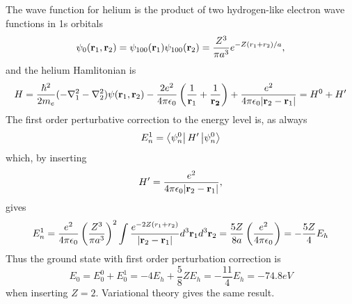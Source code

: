 \documentclass[11pt]{amsart}
\begin{document}
The wave function for helium is the product of two hydrogen-like electron wave functions in 1s orbitals
\begin{equation}
\label{eq:heliumwave}
\psi_0(\vb{r}_1,\vb{r}_2) = \psi_{100}(\vb{r}_1)\psi_{100}(\vb{r}_2)=\frac{Z^3}{\pi a^3}e^{-Z(r_1+r_2)/a},
\end{equation}
and the helium Hamlitonian is
\begin{equation}
H = \frac{\hbar^2}{2m_e}(-\nabla^2_1-\nabla^2_2)\psi(\vb{r}_1,\vb{r}_2) - \frac{2e^2}{4\pi\epsilon_0}\left(\frac{1}{\vb{r}_1}+\frac{1}{\vb{r_2}} \right) + \frac{e^2}{4\pi\epsilon_0\abs{\vb{r}_2-\vb{r}_1}} = H^0 + H'
\end{equation}
The first order perturbative correction to the energy level is, as always
\begin{equation}
\label{eq:heliumgroundEpeturb}
E_n^1 = \bra{\psi_n^0}H'\ket{\psi_n^0}
\end{equation}
which, by inserting
\begin{equation*}
H' = \frac{e^2}{4\pi\epsilon_0\abs{\vb{r}_2-\vb{r}_1}},
\end{equation*}
gives
\begin{equation}
E_n^1 = \frac{e^2}{4\pi\epsilon_0}\left(\frac{Z^3}{\pi a^3} \right)^2\int\frac{e^{-2Z(r_1+r_2)}}{\abs{\vb{r}_2-\vb{r}_1}}d^3\vb{r}_1d^3\vb{r}_2 = \frac{5Z}{8a}\left(\frac{e^2}{4\pi\epsilon_0} \right) = -\frac{5Z}{4}E_h
\end{equation}
Thus the ground state with first order perturbation correction is
\begin{equation}
E_0 = E_0^0 + E_0^1 = -4E_h + \frac{5}{8}ZE_h = -\frac{11}{4}E_h = -74.8eV
\end{equation}
when inserting $Z=2$. Variational theory gives the same result.
\end{document}
